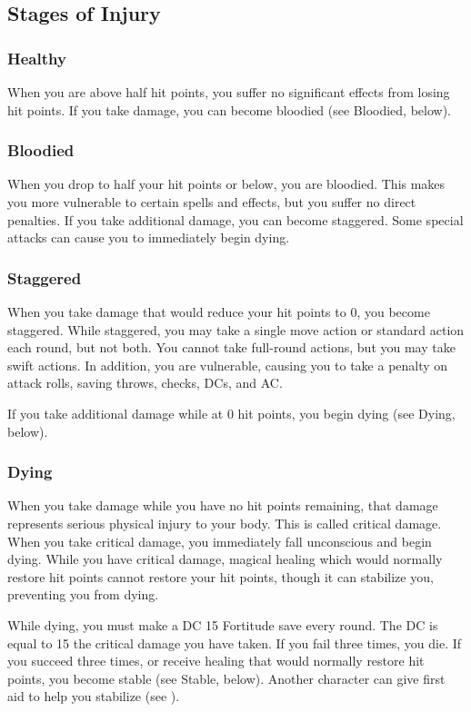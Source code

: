 \subsection{Stages of Injury}

\subsubsection{Healthy} 
When you are above half hit points, you suffer no significant effects from losing hit points. If you take damage, you can become bloodied (see Bloodied, below).

\subsubsection{Bloodied}
When you drop to half your hit points or below, you are bloodied. This makes you more vulnerable to certain spells and effects, but you suffer no direct penalties. If you take additional damage, you can become staggered. Some special attacks can cause you to immediately begin dying.

\subsubsection{Staggered}
When you take damage that would reduce your hit points to 0, you become staggered. While staggered, you may take a single move action or standard action each round, but not both. You cannot take full-round actions, but you may take swift actions. In addition, you are vulnerable, causing you to take a  penalty on attack rolls, saving throws, checks, DCs, and AC.

If you take additional damage while at 0 hit points, you begin dying (see Dying, below).

\subsubsection{Dying}
When you take damage while you have no hit points remaining, that damage represents serious physical injury to your body. This is called critical damage. When you take critical damage, you immediately fall unconscious and begin dying. While you have critical damage, magical healing which would normally restore hit points cannot restore your hit points, though it can stabilize you, preventing you from dying.

While dying, you must make a DC 15 Fortitude save every round. The DC is equal to 15 \add the critical damage you have taken. If you fail three times, you die. If you succeed three times, or receive healing that would normally restore hit points, you become stable (see Stable, below). Another character can give first aid to help you stabilize (see ).

